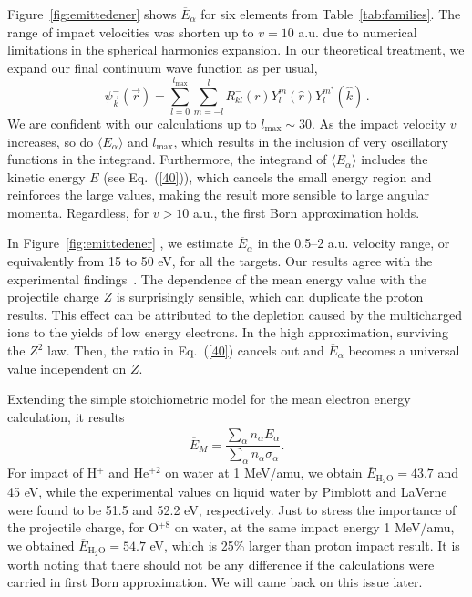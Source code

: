 \documentclass[preprint,12pt]{article}
\begin{document}
Figure~\ref{fig:emittedener} shows $\overline{E}_{\alpha}$ for six elements from 
Table~\ref{tab:families}. The range of impact velocities was shorten up 
to $v=10$ a.u. due to numerical limitations in the spherical harmonics 
expansion. In our theoretical treatment, we expand our final continuum 
wave function as per usual,
\begin{equation}
\psi_{\overrightarrow{k}}^{-}(\overrightarrow{r})=\sum_{l=0}^{l_{\max
}}\sum_{m=-l}^{l}R_{kl}^{-}(r)Y_{l}^{m}(\widehat{r})Y_{l}^{m^{\ast }}
(\widehat{k})\,.
\label{60}
\end{equation}
We are confident with our calculations up to $l_{\max}\sim 30$. 
As the impact velocity $v$ increases, so do $\langle E_{\alpha}\rangle$
and $l_{\max}$, which results in the inclusion of very oscillatory 
functions in the integrand. Furthermore, the integrand of
$\langle E_{\alpha}\rangle$ includes the kinetic energy $E$
(see Eq.~(\ref{40})), which cancels the small energy region and 
reinforces the large values, making the result more sensible to large
angular momenta. Regardless, for $v>10$ a.u., the first Born 
approximation holds.

In Figure~\ref{fig:emittedener} , we estimate $\overline{E}_{\alpha}$ in the 0.5--2 a.u.
velocity range, or equivalently from 15 to 50 eV, for all the targets.
Our results agree with the experimental findings~\cite{surdutovic2018}. 
The dependence of the mean energy value with the projectile charge $Z$ 
is surprisingly sensible, which can duplicate the proton results. 
This effect can be attributed to the depletion caused by the 
multicharged ions to the yields of low energy electrons. In the high 
approximation, surviving the $Z^{2}$ law. Then, the ratio in 
Eq.~(\ref{40}) cancels out and $\overline{E}_{\alpha}$ becomes a 
universal value independent on $Z$.

Extending the simple stoichiometric model for the mean electron energy
calculation, it results
\begin{equation}
\overline{E}_{M}=\frac{\sum\limits_{\alpha}n_{\alpha}
\overline{E_{\alpha}}}{\sum\limits_{\alpha}n_{\alpha}\sigma_{\alpha}}.
\label{70}
\end{equation}
For impact of H$^{+}$ and He$^{+2}$ on water at 1 MeV/amu, we obtain 
\mbox{$\overline{E}_{\text{H}_{2}\text{O}}=43.7$} and 45 eV, while the 
experimental values 
on liquid water by Pimblott and LaVerne \cite{pimblott2007} were found 
to be 51.5 and 52.2 eV, respectively. Just to stress the importance of 
the projectile charge, for O$^{+8}$ on water, at the same impact energy 
1 MeV/amu, we obtained \mbox{$\overline{E}_{\text{H}_{2}\text{O}}=54.7$} eV, 
which is 25\% larger than proton impact result. It is worth noting that 
there should not be any difference if the calculations were carried in 
first Born approximation. We will came back on this issue later.
\end{document}
